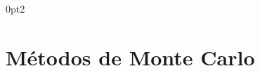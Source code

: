 \titlespacing*{\subsection}
  {0pt}{2\baselineskip}{\baselineskip}

\chapter{Métodos de Monte Carlo}
